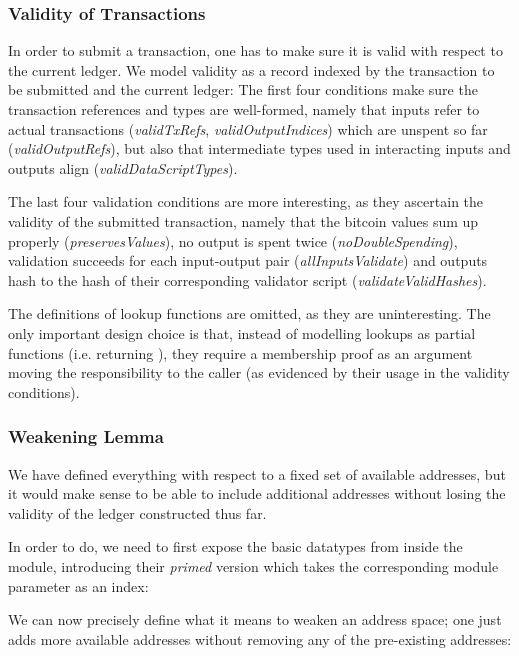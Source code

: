 \documentclass[acmsmall,nonacm=true,screen=true]{acmart}
\begin{document}
\subsubsection{Validity of Τransactions}
In order to submit a transaction, one has to make sure it is valid with respect to the current ledger.
We model validity as a record indexed by the transaction to be submitted and the current ledger:
\UTXOvalidA{}
\UTXOvalidB{}
The first four conditions make sure the transaction references and types are well-formed, namely that
inputs refer to actual transactions (\textit{validTxRefs}, \textit{validOutputIndices})
which are unspent so far (\textit{validOutputRefs}), but also that intermediate types used in interacting
inputs and outputs align (\textit{validDataScriptTypes}).

The last four validation conditions are more interesting, as they ascertain the validity of the submitted transaction,
namely that the bitcoin values sum up properly (\textit{preservesValues}), no output is spent twice (\textit{noDoubleSpending}),
validation succeeds for each input-output pair (\textit{allInputsValidate}) and outputs hash to the hash of their corresponding 
validator script (\textit{validateValidHashes}).

The definitions of lookup functions are omitted, as they are uninteresting. The only important design choice is that,
instead of modelling lookups as partial functions (i.e. returning \inlineMaybe{}), they require a membership
proof as an argument moving the responsibility to the caller (as evidenced by their usage in the validity conditions).

\subsubsection{Weakening Lemma}
We have defined everything with respect to a fixed set of available addresses, but it would make sense to be able to include
additional addresses without losing the validity of the ledger constructed thus far.

In order to do, we need to first expose the basic datatypes from inside the module,
introducing their \textit{primed} version which takes the corresponding module parameter as an index:

\UTXOprimedTypes{}

We can now precisely define what it means to weaken an address space; one just adds more available
addresses without removing any of the pre-existing addresses:
\end{document}
